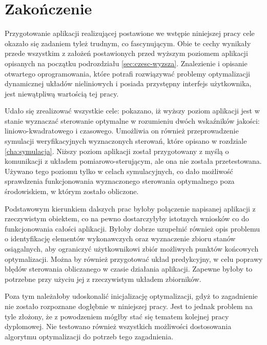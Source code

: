 \chapter*{Zakończenie}
\label{cha:zakonczenie}

Przygotowanie aplikacji realizującej postawione we wstępie niniejszej pracy cele okazało się zadaniem tyleż trudnym, co fascynującym. Obie te cechy wynikały przede wszystkim z założeń postawionych przed wyższym poziomem aplikacji opisanych na początku podrozdziału \ref{sec:czesc-wyzsza}. Znalezienie i opisanie otwartego oprogramowania, które potrafi rozwiązywać problemy optymalizacji dynamicznej układów nieliniowych i posiada przystępny interfejs użytkownika, jest niewątpliwą wartością tej pracy.

Udało się zrealizować wszystkie cele: pokazano, iż wyższy poziom aplikacji jest w stanie wyznaczać sterowanie optymalne w rozumieniu dwóch wskaźników jakości: liniowo-kwadratowego i czasowego. Umożliwia on również przeprowadzenie symulacji weryfikacyjnych wyznaczonych sterowań, które opisano w rozdziale \ref{cha:symulacja}. Niższy poziom aplikacji został przygotowany z myślą o komunikacji z układem pomiarowo-sterującym, ale ona nie została przetestowana. Używano tego poziomu tylko w celach symulacyjnych, co dało możliwość sprawdzenia funkcjonowania wyznaczonego sterowania optymalnego poza środowiskiem, w którym zostało obliczone.

Podstawowym kierunkiem dalszych prac byłoby połączenie napisanej aplikacji z rzeczywistym obiektem, co na pewno dostarczyłyby istotnych wniosków co do funkcjonowania całości aplikacji. Byłoby dobrze uzupełnić również opis problemu o identyfikację elementów wykonawczych oraz wyznaczenie zbioru stanów osiągalnych, aby ograniczyć użytkownikowi zbiór możliwych punktów końcowych optymalizacji. Można by również przygotować układ predykcyjny, w celu poprawy błędów sterowania obliczanego w czasie działania aplikacji. Zapewne byłoby to potrzebne przy użyciu jej z rzeczywistym układem zbiorników.

Poza tym należałoby udoskonalić inicjalizację optymalizacji, gdyż to zagadnienie nie zostało rozpoznane dogłębnie w niniejszej pracy. Jest to jednak problem na tyle złożony, że z powodzeniem mógłby stać się tematem kolejnej pracy dyplomowej. Nie testowano również wszystkich możliwości dostosowania algorytmu optymalizacji do potrzeb tego zagadnienia.
